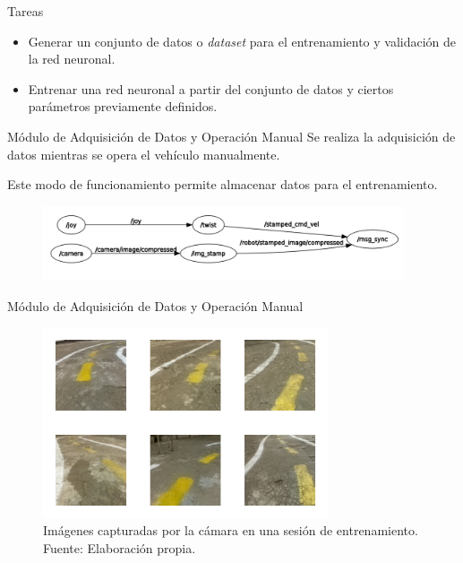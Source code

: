 \documentclass[10pt]{beamer}
\begin{document}
\begin{frame}{Tareas}
    \begin{itemize}
        \item Generar un conjunto de datos o \textit{dataset} para el entrenamiento y validación de la red neuronal.
        \item Entrenar una red neuronal a partir del conjunto de datos y ciertos parámetros previamente definidos.
    \end{itemize}
\end{frame}

\begin{frame}{Módulo de Adquisición de Datos y Operación Manual}
    Se realiza la adquisición de datos mientras se opera el vehículo manualmente.
    
    Este modo de funcionamiento permite almacenar datos para el entrenamiento.

    \begin{figure}[!h] 
        \centering
        \includegraphics[width=0.95\textwidth]{../img/nodosdaq}
        \end{figure}
    
\end{frame}


\begin{frame}{Módulo de Adquisición de Datos y Operación Manual}
    \begin{figure}[!h] 
        \centering
        \includegraphics[width=0.75\textwidth]{../img/fotosejemplo}
        \caption[Imágenes capturadas por la cámara en una sesión de entrenamiento]{Imágenes capturadas por la cámara en una sesión de entrenamiento. Fuente: Elaboración propia. }
    \end{figure}
    
\end{frame}
\end{document}
